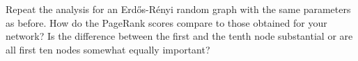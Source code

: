 \documentclass[11pt,a4paper]{article}
\begin{document}
Repeat the analysis for an Erd\H{o}s-R\'{e}nyi random graph with the same parameters as before. How do the PageRank scores compare to those obtained for your network? Is the difference between the first and the tenth node substantial or are all first ten nodes somewhat equally important?

%



\end{document}
